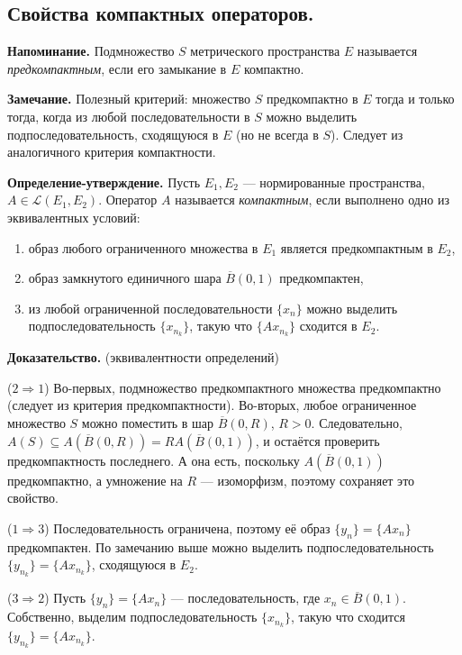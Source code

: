 \documentclass[12pt, a4paper]{article}
\renewcommand{\subset}{\subseteq}   %
\begin{document}
\subsection{Свойства компактных операторов.}

\textbf{Напоминание.} Подмножество $S$ метрического пространства $E$ называется \textit{предкомпактным}, если его замыкание в $E$ компактно.

\textbf{Замечание.} Полезный критерий: множество $S$ предкомпактно в $E$ тогда и только тогда, когда из любой последовательности в $S$ можно выделить подпоследовательность, сходящуюся в $E$ (но не всегда в $S$). Следует из аналогичного критерия компактности.

\textbf{Определение-утверждение.} Пусть $E_1, E_2$ --- нормированные пространства, $A \in \mathcal L(E_1, E_2)$.
Оператор $A$ называется \textit{компактным}, если выполнено одно из эквивалентных условий:
\begin{enumerate}
    \item образ любого ограниченного множества в $E_1$ является предкомпактным в $E_2$,

    \item образ замкнутого единичного шара $\overline{B}(0, 1)$ предкомпактен,

    \item из любой ограниченной последовательности $\{x_n\}$ можно выделить подпоследовательность $\{x_{n_k}\}$, такую что $\{Ax_{n_k}\}$ сходится в $E_2$.
\end{enumerate}

\textbf{Доказательство.} (эквивалентности определений)

($2 \Rightarrow 1$) Во-первых, подмножество предкомпактного множества предкомпактно (следует из критерия предкомпактности). Во-вторых, любое ограниченное множество $S$ можно поместить в шар $\overline B(0, R)$, $R > 0$. Следовательно, $A(S) \subset A(\overline B(0, R)) = R A(\overline B(0, 1))$, и остаётся проверить предкомпактность последнего. А она есть, поскольку $A(\overline B(0, 1))$ предкомпактно, а умножение на $R$ --- изоморфизм, поэтому сохраняет это свойство.

($1 \Rightarrow 3$) Последовательность ограничена, поэтому её образ $\{y_n\} = \{Ax_n\}$ предкомпактен. По замечанию выше можно выделить подпоследовательность $\{y_{n_k}\} = \{Ax_{n_k}\}$, сходящуюся в $E_2$.

($3 \Rightarrow 2$) Пусть $\{y_n\} = \{Ax_n\}$ --- последовательность, где $x_n \in \overline B(0, 1)$. Собственно, выделим подпоследовательность $\{x_{n_k}\}$, такую что сходится $\{y_{n_k}\} = \{Ax_{n_k}\}$.
\end{document}
